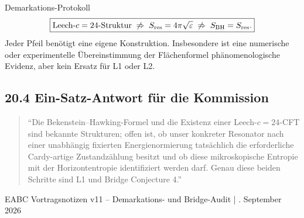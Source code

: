 \documentclass[11pt,a4paper]{article}
\begin{document}
\begin{statusbox}{Demarkations-Protokoll}
\[
\boxed{
\text{Leech-}c=24\text{-Struktur}
\;\not\Rightarrow\;
S_{\rm res}=4\pi\sqrt{\varepsilon}
\;\not\Rightarrow\;
S_{\rm BH}=S_{\rm res}.}
\]
Jeder Pfeil benötigt eine eigene Konstruktion. Insbesondere ist eine numerische oder experimentelle Übereinstimmung der Flächenformel phänomenologische Evidenz, aber kein Ersatz für L1 oder L2.
\end{statusbox}

\subsection*{20.4 Ein-Satz-Antwort für die Kommission}
\begin{quote}
``Die Bekenstein--Hawking-Formel und die Existenz einer Leech-$c=24$-CFT sind bekannte Strukturen; offen ist, ob unser konkreter Resonator nach einer unabhängig fixierten Energienormierung tatsächlich die erforderliche Cardy-artige Zustandzählung besitzt und ob diese mikroskopische Entropie mit der Horizontentropie identifiziert werden darf. Genau diese beiden Schritte sind L1 und Bridge Conjecture 4.''
\end{quote}

\vfill
\begin{center}
\small EABC Vortragsnotizen v11 -- Demarkations- und Bridge-Audit \quad | . September 2026
\end{center}
\end{document}
